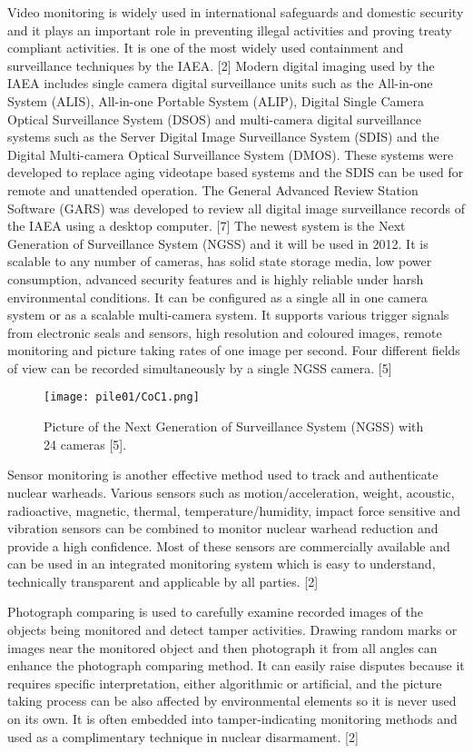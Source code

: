 \documentclass[twocolumn,a4paper]{article}
\begin{document}
Video monitoring is widely used in international safeguards and domestic security and it plays an
important role in preventing illegal activities and proving treaty compliant activities. It is one of the
most widely used containment and surveillance techniques by the IAEA. [2] Modern digital imaging
used by the IAEA includes single camera digital surveillance units such as the All-in-one System
(ALIS), All-in-one Portable System (ALIP), Digital Single Camera Optical Surveillance System (DSOS)
and multi-camera digital surveillance systems such as the Server Digital Image Surveillance System
(SDIS) and the Digital Multi-camera Optical Surveillance System (DMOS). These systems were
developed to replace aging videotape based systems and the SDIS can be used for remote and
unattended operation. The General Advanced Review Station Software (GARS) was developed to
review all digital image surveillance records of the IAEA using a desktop computer. [7] The newest
system is the Next Generation of Surveillance System (NGSS) and it will be used in 2012. It is scalable
to any number of cameras, has solid state storage media, low power consumption, advanced
security features and is highly reliable under harsh environmental conditions. It can be configured as
a single all in one camera system or as a scalable multi-camera system. It supports various trigger
signals from electronic seals and sensors, high resolution and coloured images, remote monitoring
and picture taking rates of one image per second. Four different fields of view can be recorded
simultaneously by a single NGSS camera. [5]

\begin{figure}
  \texttt{[image: pile01/CoC1.png]}
  \caption{Picture of the Next Generation of Surveillance System (NGSS) with 24 cameras [5].}
\end{figure}

Sensor monitoring is another effective method used to track and authenticate nuclear warheads.
Various sensors such as motion/acceleration, weight, acoustic, radioactive, magnetic, thermal,
temperature/humidity, impact force sensitive and vibration sensors can be combined to monitor
nuclear warhead reduction and provide a high confidence. Most of these sensors are commercially
available and can be used in an integrated monitoring system which is easy to understand,
technically transparent and applicable by all parties. [2]

Photograph comparing is used to carefully examine recorded images of the objects being monitored
and detect tamper activities. Drawing random marks or images near the monitored object and then
photograph it from all angles can enhance the photograph comparing method. It can easily raise
disputes because it requires specific interpretation, either algorithmic or artificial, and the picture
taking process can be also affected by environmental elements so it is never used on its own. It is
often embedded into tamper-indicating monitoring methods and used as a complimentary
technique in nuclear disarmament. [2]
\end{document}
